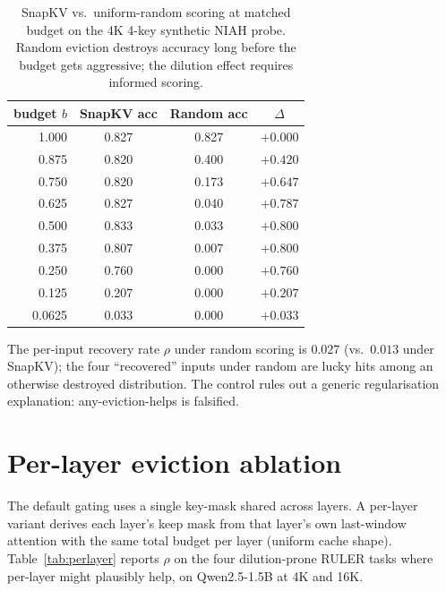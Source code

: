 \documentclass{article} %
\begin{document}
\begin{table}[h]
\centering
\caption{SnapKV vs.\ uniform-random scoring at matched budget on the 4K
4-key synthetic NIAH probe. Random eviction destroys accuracy long before
the budget gets aggressive; the dilution effect requires informed scoring.}
\label{tab:random-control}
\begin{tabular}{rccc}
\toprule
budget $b$ & SnapKV acc & Random acc & $\Delta$ \\
\midrule
1.000  & 0.827 & 0.827 & $+0.000$ \\
0.875  & 0.820 & 0.400 & $+0.420$ \\
0.750  & 0.820 & 0.173 & $+0.647$ \\
0.625  & 0.827 & 0.040 & $+0.787$ \\
0.500  & 0.833 & 0.033 & $+0.800$ \\
0.375  & 0.807 & 0.007 & $+0.800$ \\
0.250  & 0.760 & 0.000 & $+0.760$ \\
0.125  & 0.207 & 0.000 & $+0.207$ \\
0.0625 & 0.033 & 0.000 & $+0.033$ \\
\bottomrule
\end{tabular}
\end{table}

The per-input recovery rate $\rho$ under random scoring is $0.027$
(vs.\ $0.013$ under SnapKV); the four ``recovered'' inputs under random
are lucky hits among an otherwise destroyed distribution. The control
rules out a generic regularisation explanation: any-eviction-helps is
falsified.

\section{Per-layer eviction ablation}
\label{app:per-layer}

The default gating uses a single key-mask shared across layers. A per-layer
variant derives each layer's keep mask from that layer's own last-window
attention with the same total budget per layer (uniform cache shape).
Table~\ref{tab:perlayer} reports $\rho$ on the four dilution-prone RULER tasks
where per-layer might plausibly help, on Qwen2.5-1.5B at 4K and 16K.
\end{document}
